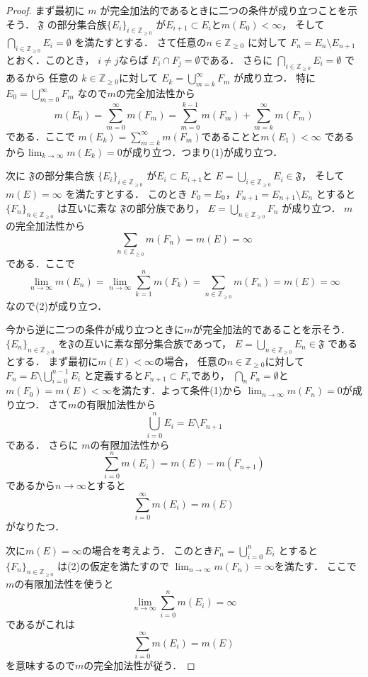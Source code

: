 \documentclass[leqno, a4paper, 12pt]{jsarticle}
\newcommand{\zz}{\mathbb{Z}}
\begin{document}
\begin{proof}
まず最初に
$m$
が完全加法的であるときに二つの条件が成り立つことを示そう．
$\mathfrak{F}$
の部分集合族$\{E_{i}\}_{i\in \zz_{\ge 0}}$
が$E_{i+1}\subset E_{i}$と$m(E_{0})<\infty$，
そして
$\bigcap_{i\in \zz_{\ge 0}}E_{i}=\emptyset$
を満たすとする．
さて任意の$n\in \zz_{\ge 0}$
に対して
$F_{n}=E_{n}\setminus E_{n+1}$
とおく．このとき，
$i\neq j$ならば
$F_{i}\cap F_{j}=\emptyset$である．
さらに
$\bigcap_{i\in \zz_{\ge 0}}E_{i}=\emptyset$
であるから
任意の
$k\in \zz_{\ge 0}$に対して
$E_{k}=\bigcup_{m=k}^{\infty}F_{m}$
が成り立つ．
特に
$E_{0}=\bigcup_{m=0}^{\infty}F_{m}$
なので$m$の完全加法性から
\[
m(E_{0})=\sum_{m=0}^{\infty}m(F_{m})=\sum_{m=0}^{k-1}m(F_{m})+
\sum_{m=k}^{\infty}m(F_{m})
\]
である．ここで
$m(E_{k})=\sum_{m=k}^{\infty}m(F_{m})$であることと$m(E_{1})<\infty$
であるから$\lim_{k\to \infty}m(E_{k})=0$が成り立つ．つまり(1)が成り立つ．

次に
$\mathfrak{F}$の部分集合族
$\{E_{i}\}_{i\in \zz_{\ge 0}}$
が$E_{i}\subset E_{i+1}$と
$E=\bigcup_{i\in \zz_{\ge 0}}E_{i}\in \mathfrak{F}$，
そして
$m(E)=\infty$
を満たすとする．
このとき
$F_{0}=E_{0}$，$F_{n+1}=E_{n+1}\setminus E_{n}$
とすると$\{F_{n}\}_{n\in \zz_{\ge 0} }$
は互いに素な
$\mathfrak{F}$の部分族であり，
$E=\bigcup_{n\in \zz_{\ge 0}}F_{n}$
が成り立つ．
$m$の完全加法性から
\[
\sum_{n\in \zz_{\ge 0}}m(F_{n})=m(E)=\infty
\]
である．ここで
\[
\lim_{n\to \infty}m(E_{n})=\lim_{n\to \infty}\sum_{k=1}^{n}m(F_{k})
=\sum_{n\in \zz_{\ge 0}}m(F_{n})=m(E)=\infty
\]
なので(2)が成り立つ．


今から逆に二つの条件が成り立つときに$m$が完全加法的であることを示そう．
$\{E_{n}\}_{n\in \zz_{\ge 0}}$
を$\mathfrak{F}$の互いに素な部分集合族であって，
$E=\bigcup_{n\in \zz_{\ge 0}}E_{n}\in \mathfrak{F}$
であるとする．
まず最初に$m(E)<\infty$の場合，
任意の$n\in \zz_{\ge 0}$に対して
$F_{n}=E\setminus \bigcup_{i=0}^{n-1}E_{i}$
と定義すると$F_{n+1}\subset F_{n}$であり，
$\bigcap_{n}F_{n}=\emptyset$と
$m(F_{0})=m(E)<\infty$を満たす．よって条件(1)から
$\lim_{n\to \infty}m(F_{n})=0$が成り立つ．
さて$m$の有限加法性から
\[
\bigcup_{i=0}^{n}E_{i}=E\setminus F_{n+1}
\]
である．
さらに
$m$の有限加法性から
\[
\sum_{i=0}^{n}m(E_{i})=m(E)-m( F_{n+1})
\]
であるから$n\to \infty$とすると
\[
\sum_{i=0}^{\infty}m(E_{i})=m(E)
\]
がなりたつ．

次に$m(E)=\infty$の場合を考えよう．
このとき$F_{n}=\bigcup_{i=0}^{n}E_{i}$
とすると$\{F_{n}\}_{n\in \zz_{\ge 0}}$
は(2)の仮定を満たすので
$\lim_{n\to \infty}m(F_{n})=\infty$を満たす．
ここで$m$の有限加法性を使うと
\[
\lim_{n\to \infty}\sum_{i=0}^{n}m(E_{i})=\infty
\]
であるがこれは
\[
\sum_{i=0}^{\infty}m(E_{i})=m(E)
\]
を意味するので$m$の完全加法性が従う．
\end{proof}
\end{document}
